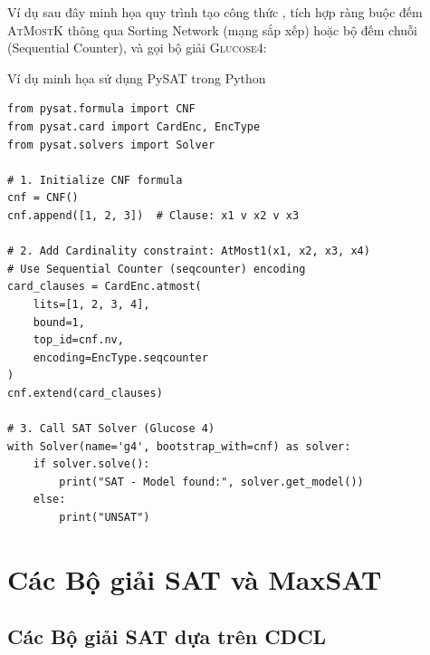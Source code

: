 Ví dụ sau đây minh họa quy trình tạo công thức \CNF, tích hợp ràng buộc đếm \textsc{AtMostK} thông qua Sorting Network (mạng sắp xếp) hoặc bộ đếm chuỗi (Sequential Counter), và gọi bộ giải \textsc{Glucose4}:

\begin{keyidea}{Ví dụ minh họa sử dụng PySAT trong Python}
\begin{verbatim}
from pysat.formula import CNF
from pysat.card import CardEnc, EncType
from pysat.solvers import Solver

# 1. Initialize CNF formula
cnf = CNF()
cnf.append([1, 2, 3])  # Clause: x1 v x2 v x3

# 2. Add Cardinality constraint: AtMost1(x1, x2, x3, x4)
# Use Sequential Counter (seqcounter) encoding
card_clauses = CardEnc.atmost(
    lits=[1, 2, 3, 4],
    bound=1,
    top_id=cnf.nv,
    encoding=EncType.seqcounter
)
cnf.extend(card_clauses)

# 3. Call SAT Solver (Glucose 4)
with Solver(name='g4', bootstrap_with=cnf) as solver:
    if solver.solve():
        print("SAT - Model found:", solver.get_model())
    else:
        print("UNSAT")
\end{verbatim}
\end{keyidea}

\section{Các Bộ giải SAT và MaxSAT}

\subsection{Các Bộ giải SAT dựa trên CDCL}

